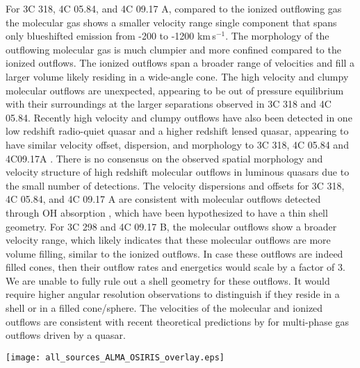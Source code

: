 \documentclass[twocolumn]{aastex63}
\newcommand{\ha}{H$\alpha$\xspace}
\newcommand{\oiii}{[O{\sc III}]\xspace}
\newcommand{\kms}{km\,s$^{-1}$}
\begin{document}
For 3C 318, 4C 05.84, and 4C 09.17 A, compared to the ionized outflowing gas the molecular gas shows a smaller velocity range single component that spans only blueshifted emission from -200 to -1200 \kms. The morphology of the outflowing molecular gas is much clumpier and more confined compared to the ionized outflows. The ionized outflows span a broader range of velocities and fill a larger volume likely residing in a wide-angle cone. The high velocity and clumpy molecular outflows are unexpected, appearing to be out of pressure equilibrium with their surroundings at the larger separations observed in 3C 318 and 4C 05.84. Recently high velocity and clumpy outflows have also been detected in one low redshift radio-quiet quasar and a higher redshift lensed quasar, appearing to have similar velocity offset, dispersion, and morphology to 3C 318, 4C 05.84 and 4C09.17A \citep{Bischetti19,Chartas20}. There is no consensus on the observed spatial morphology and velocity structure of high redshift molecular outflows in luminous quasars due to the small number of detections. The velocity dispersions and offsets for 3C 318, 4C 05.84, and 4C 09.17 A are consistent with molecular outflows detected through OH absorption \citep{Veilleux13}, which have been hypothesized to have a thin shell geometry. For 3C 298 and 4C 09.17 B, the molecular outflows show a broader velocity range, which likely indicates that these molecular outflows are more volume filling, similar to the ionized outflows. In case these outflows are indeed filled cones, then their outflow rates and energetics would scale by a factor of 3. We are unable to fully rule out a shell geometry for these outflows. It would require higher angular resolution observations to distinguish if they reside in a shell or in a filled cone/sphere. The velocities of the molecular and ionized outflows are consistent with recent theoretical predictions by \citet{Richings20} for multi-phase gas outflows driven by a quasar. \\

\begin{figure*}
    \centering
    \texttt{[image: all\_sources\_ALMA\_OSIRIS\_overlay.eps]}
    \caption{We present the comparison between the ionized outflow and the molecular gas distribution, extent, and morphology in sources where we detect a multi-phase gas outflow. In the background, we show the line integrated CO intensity tracing the cold molecular gas. Violet contours outline the location of the molecular outflows in the quasar host galaxies, the teal contour in the 4C09.17 system represent the molecular outflow in the merging galaxy. The white contours show the ionized outflow traced through the \oiii\ 5007 \AA\ emission line for all systems except 4C 05.84 where it is traced with \ha. The white star represents the quasar's location, while the bar to the right of each source represents 1 arcsecond.}
    \label{fig:CO_ionized_outflows}
\end{figure*}
\end{document}
